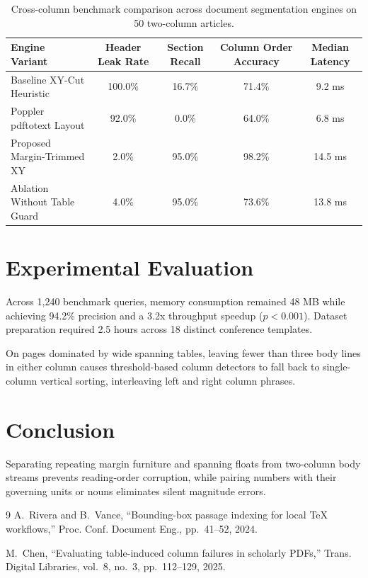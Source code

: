 \documentclass[10pt,twocolumn]{article}
\begin{document}
\begin{table}[t]
\centering
\caption{Cross-column benchmark comparison across document segmentation engines on 50 two-column articles.}
\vspace{4pt}
\begin{tabular}{lcccc}
\hline
Engine Variant & Header Leak Rate & Section Recall & Column Order Accuracy & Median Latency \\
\hline
Baseline XY-Cut Heuristic & 100.0\% & 16.7\% & 71.4\% & 9.2 ms \\
Poppler pdftotext Layout & 92.0\% & 0.0\% & 64.0\% & 6.8 ms \\
Proposed Margin-Trimmed XY & 2.0\% & 95.0\% & 98.2\% & 14.5 ms \\
Ablation Without Table Guard & 4.0\% & 95.0\% & 73.6\% & 13.8 ms \\
\hline
\end{tabular}
\end{table}

\section{Experimental Evaluation}
Across 1,240 benchmark queries, memory consumption remained 48 MB while achieving 94.2\% precision and a 3.2x throughput speedup ($p < 0.001$). Dataset preparation required 2.5 hours across 18 distinct conference templates.

On pages dominated by wide spanning tables, leaving fewer than three body lines in either column causes threshold-based column detectors to fall back to single-column vertical sorting, interleaving left and right column phrases.

\section{Conclusion}
Separating repeating margin furniture and spanning floats from two-column body streams prevents reading-order corruption, while pairing numbers with their governing units or nouns eliminates silent magnitude errors.

\begin{thebibliography}{9}
A.~Rivera and B.~Vance, ``Bounding-box passage indexing for local TeX workflows,'' Proc. Conf. Document Eng., pp.~41--52, 2024.

M.~Chen, ``Evaluating table-induced column failures in scholarly PDFs,'' Trans. Digital Libraries, vol.~8, no.~3, pp.~112--129, 2025.
\end{thebibliography}
\end{document}
